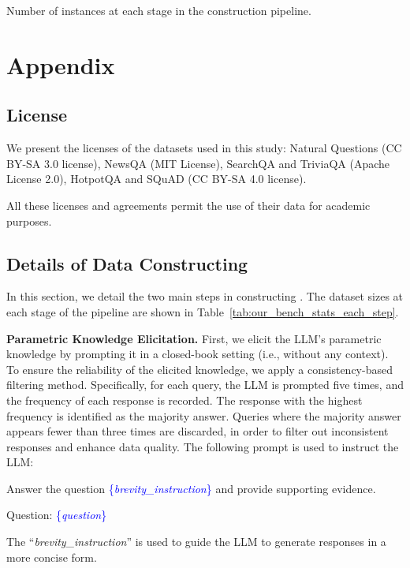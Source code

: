 \appendix
\begin{table}[t!]
  \centering
  
 \caption{Number of instances at each stage in the \dataset{} construction pipeline.}
 \label{tab:our_bench_stats_each_step}
\end{table}
\section{Appendix}
\subsection{License}
We present the licenses of the datasets used in this study: Natural Questions (CC BY-SA 3.0 license), NewsQA (MIT License), SearchQA and TriviaQA (Apache License 2.0), HotpotQA and SQuAD (CC BY-SA 4.0 license).

All these licenses and agreements permit the use of their data for academic purposes.

\subsection{Details of Data Constructing}
\label{append:prompts}
In this section, we detail the two main steps in constructing \dataset{}. The dataset sizes at each stage of the pipeline are shown in Table~\ref{tab:our_bench_stats_each_step}.


\textbf{Parametric Knowledge Elicitation.} First, we elicit the LLM's parametric knowledge by prompting it in a closed-book setting (i.e., without any context). To ensure the reliability of the elicited knowledge, we apply a consistency-based filtering method. Specifically, for each query, the LLM is prompted five times, and the frequency of each response is recorded. The response with the highest frequency is identified as the majority answer. Queries where the majority answer appears fewer than three times are discarded, in order to filter out inconsistent responses and enhance data quality. The following prompt is used to instruct the LLM:
\begin{tcolorbox}
[title=Prompt for eliciting parametric knowledge,colback=blue!10,colframe=blue!50!black,arc=1mm,boxrule=1pt,left=1mm,right=1mm,top=1mm,bottom=1mm]
Answer the question \textcolor{blue}{\{\textit{brevity\_instruction}\}} and provide supporting evidence.

Question: \textcolor{blue}{\{\textit{question}\}}
\end{tcolorbox}
\noindent The ``\textit{brevity\_instruction}'' is used to guide the LLM to generate responses in a more concise form.

